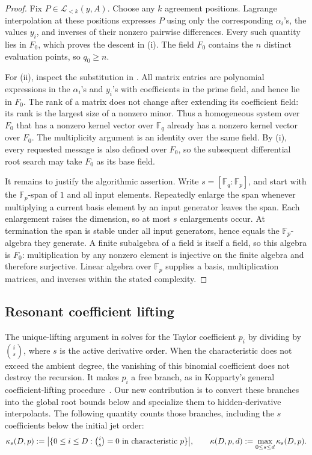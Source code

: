 \documentclass[11pt,letterpaper]{article}
\theoremstyle{definition}
\newcommand{\F}{\mathbb{F}}
\newcommand{\List}{\mathcal{L}}
\begin{document}
\begin{proof}
Fix \(P\in\List_{<k}(y,A)\).  Choose any \(k\) agreement positions.
Lagrange interpolation at these positions expresses \(P\) using only the
corresponding \(\alpha_i\)'s, the values \(y_i\), and inverses of their
nonzero pairwise differences.  Every such quantity lies in \(F_0\), which
proves the descent in (i).  The field \(F_0\) contains the \(n\) distinct
evaluation points, so \(q_0\geq n\).

For (ii), inspect the substitution in .  All
matrix entries are polynomial expressions in the \(\alpha_i\)'s and
\(y_i\)'s with coefficients in the prime field, and hence lie in \(F_0\).
The rank of a matrix does not change after extending its coefficient field:
its rank is the largest size of a nonzero minor.  Thus a homogeneous system
over \(F_0\) that has a nonzero kernel vector over \(\F_q\) already has a
nonzero kernel vector over \(F_0\).  The multiplicity argument is an
identity over the same field.  By (i), every requested message is also
defined over \(F_0\), so the subsequent differential root search may take
\(F_0\) as its base field.

It remains to justify the algorithmic assertion.  Write
\(s=[\F_q:\F_p]\), and start with the \(\F_p\)-span of \(1\) and all input
elements.  Repeatedly enlarge the span whenever multiplying a current basis
element by an input generator leaves the span.  Each enlargement raises the
dimension, so at most \(s\) enlargements occur.  At termination the span is
stable under all input generators, hence equals the \(\F_p\)-algebra they
generate.  A finite subalgebra of a field is itself a field, so this algebra
is \(F_0\): multiplication by any nonzero element is injective on the
finite algebra and therefore surjective.  Linear algebra over \(\F_p\)
supplies a basis, multiplication
matrices, and inverses within the stated complexity.
\end{proof}

\subsection{Resonant coefficient lifting}

The unique-lifting argument in  solves for the
Taylor coefficient \(p_i\) by dividing by \(\binom is\), where \(s\) is the
active derivative order.  When the characteristic does not exceed the
ambient degree, the vanishing of this binomial coefficient does not destroy
the recursion. It makes \(p_i\) a free branch, as in Kopparty's general
coefficient-lifting procedure~\cite[Corollary~4.5]{Kopparty15}. Our new
contribution is to convert these branches into the global root bounds below
and specialize them to hidden-derivative interpolants. The following quantity
counts those branches, including the \(s\) coefficients below the initial
jet order:
\begin{equation}
  \kappa_s(D,p)
  :=
  \bigl|
    \{0\leq i\leq D:\tbinom is=0\text{ in characteristic }p\}
  \bigr|,
  \qquad
  \kappa(D,p,d):=\max_{0\leq s\leq d}\kappa_s(D,p).
  \label{eq:resonance-count}
\end{equation}
\end{document}
